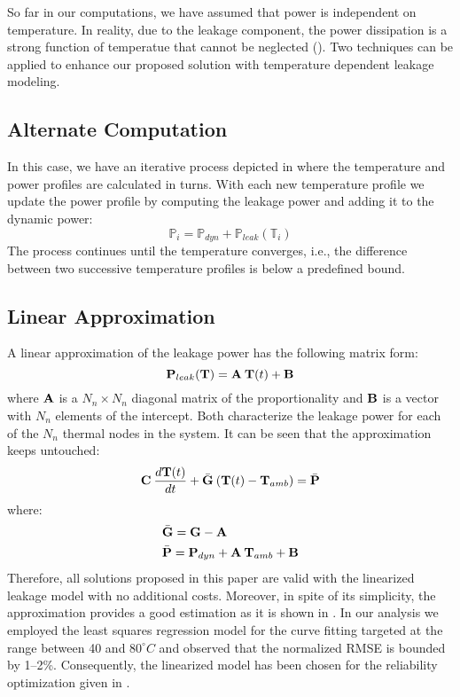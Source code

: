 So far in our computations, we have assumed that power is independent on temperature. In reality, due to the leakage component, the power dissipation is a strong function of temperatue that cannot be neglected (). Two techniques can be applied to enhance our proposed solution with temperature dependent leakage modeling.

\subsection{Alternate Computation}
In this case, we have an iterative process depicted in  where the temperature and power profiles are calculated in turns. With each new temperature profile we update the power profile by computing the leakage power and adding it to the dynamic power:
\[
  \mathbb{P}_i = \mathbb{P}_{dyn} + \mathbb{P}_{leak}(\mathbb{T}_i)
\]
The process continues until the temperature converges, i.e., the difference between two successive temperature profiles is below a predefined bound.

\subsection{Linear Approximation}
A linear approximation of the leakage power has the following matrix form:
\[
  \mathbf{P}_{leak}(\mathbf{T}) = \mathbf{A} \: \mathbf{T}(t) + \mathbf{B}
\]
where $\mathbf{A}$ is a $N_n \times N_n$ diagonal matrix of the proportionality and $\mathbf{B}$ is a vector with $N_n$ elements of the intercept. Both characterize the leakage power for each of the $N_n$ thermal nodes in the system. It can be seen that the approximation keeps  untouched:
\[
  \mathbf{C} \: \frac{d\mathbf{T}(t)}{dt} + \bar{\mathbf{G}} \: (\mathbf{T}(t) - \mathbf{T}_{amb}) = \bar{\mathbf{P}}
\]
where:
\begin{align*}
  & \bar{\mathbf{G}} = \mathbf{G} - \mathbf{A} \\
  & \bar{\mathbf{P}} = \mathbf{P}_{dyn} + \mathbf{A} \: \mathbf{T}_{amb} + \mathbf{B}
\end{align*}
Therefore, all solutions proposed in this paper are valid with the linearized leakage model with no additional costs. Moreover, in spite of its simplicity, the approximation provides a good estimation as it is shown in \cite{liu2007}. In our analysis we employed the least squares regression model \cite{press2007} for the curve fitting targeted at the range between 40 and $80^\circ C$ and observed that the normalized RMSE is bounded by 1--2\%. Consequently, the linearized model has been chosen for the reliability optimization given in .
